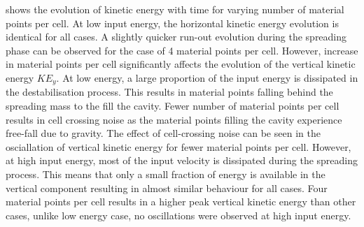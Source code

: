  shows the evolution of kinetic energy with time for varying 
number of material points per cell. At low input energy, the horizontal kinetic 
energy evolution is identical for all cases. A slightly quicker run-out 
evolution during the spreading phase can be observed for the case of 4 material 
points per cell. However, increase in material points per cell significantly 
affects the evolution of the vertical kinetic energy $KE_{y}$. At low energy, a 
large proportion of the input energy is dissipated in the destabilisation 
process. This results in material points falling behind the spreading mass to 
the fill the cavity. Fewer number of material points per cell results in cell 
crossing noise as the material points filling the cavity experience free-fall 
due to gravity. The effect of cell-crossing noise can be seen in the 
osciallation of vertical kinetic energy for fewer material points per cell. 
However, at high input energy, most of the input velocity is dissipated during 
the spreading process. This means that only a small fraction of energy is 
available in the vertical component resulting in almost similar behaviour for 
all cases. Four material points per cell results in a higher peak vertical 
kinetic energy than other cases, unlike low energy case, no oscillations were 
observed at high input energy.


